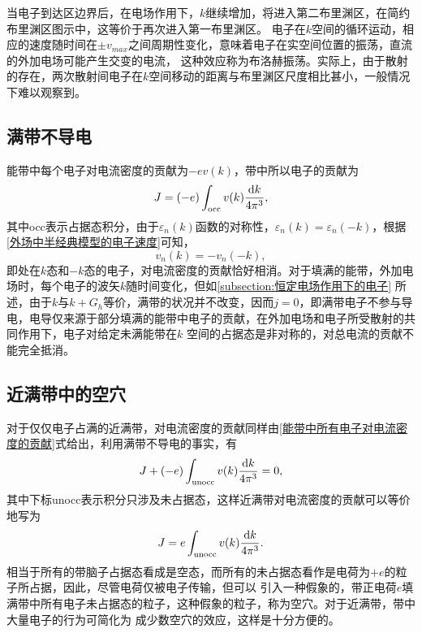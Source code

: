             当电子到达区边界后，在电场作用下，$k$继续增加，将进入第二布里渊区，在简约布里渊区图示中，这等价于再次进入第一布里渊区。
            电子在$k$空间的循环运动，相应的速度随时间在$\pm v_{max}$之间周期性变化，意味着电子在实空间位置的振荡，直流的外加电场可能产生交变的电流，
            这种效应称为布洛赫振荡。实际上，由于散射的存在，两次散射间电子在$k$空间移动的距离与布里渊区尺度相比甚小，一般情况下难以观察到。

        \subsection{满带不导电}
            能带中每个电子对电流密度的贡献为$-ev(k)$，带中所以电子的贡献为
            \begin{equation}
                J=(-e)\int_{\mathrm{occ}}v(k)\frac{\mathop{}\!\mathrm{d} k}{4\pi^3}\label{能带中所有电子对电流密度的贡献},
            \end{equation}
            其中occ表示占据态积分，由于$\varepsilon_n(k)$函数的对称性，$\varepsilon_n(k)=\varepsilon_n(-k)$，根据\autoref{外场中半经典模型的电子速度}可知，
            \begin{equation}
                v_n(k)=-v_n(-k),
            \end{equation}
            即处在$k$态和$-k$态的电子，对电流密度的贡献恰好相消。对于填满的能带，外加电场时，每个电子的波矢$k$随时间变化，但如\autoref{subsection:恒定电场作用下的电子}
            所述，由于$k$与$k+G_h$等价，满带的状况并不改变，因而$j=0$，即满带电子不参与导电，电导仅来源于部分填满的能带中电子的贡献，在外加电场和电子所受散射的共同作用下，电子对给定未满能带在$k$
            空间的占据态是非对称的，对总电流的贡献不能完全抵消。
        
        \subsection{近满带中的空穴}
            对于仅仅电子占满的近满带，对电流密度的贡献同样由\autoref{能带中所有电子对电流密度的贡献}式给出，利用满带不导电的事实，有
            \begin{equation}
                J+(-e)\int_{\mathrm{unocc}}^{}v(k)\frac{\mathop{}\!\mathrm{d} k}{4\pi^3}=0,
            \end{equation}
            其中下标unocc表示积分只涉及未占据态，这样近满带对电流密度的贡献可以等价地写为
            \begin{equation}
                J=e\int_{\mathrm{unocc}}^{}v(k)\frac{\mathop{}\!\mathrm{d} k}{4\pi^3}.                
            \end{equation}
            相当于所有的带脑子占据态看成是空态，而所有的未占据态看作是电荷为$+e$的粒子所占据，因此，尽管电荷仅被电子传输，但可以
            引入一种假象的，带正电荷$e$填满带中所有电子未占据态的粒子，这种假象的粒子，称为空穴。对于近满带，带中大量电子的行为可简化为
            成少数空穴的效应，这样是十分方便的。

